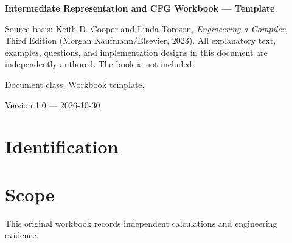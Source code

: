 \documentclass[10pt,letterpaper]{article}
\begin{document}
\hypersetup{pageanchor=false}%
\begin{titlepage}
\centering\vspace*{1.0in}
{\Huge\bfseries\textcolor{CompilerBlue}{Intermediate Representation and CFG Workbook --- Template}\par}
\vspace{.22in}{\Large Derivations, technical evidence and review\par}
\vspace{.4in}{\large Compiler Engineering Documentation Suite\par}
\vfill
\begin{minipage}{.86\linewidth}\small
Source basis: Keith D. Cooper and Linda Torczon, \emph{Engineering a Compiler}, Third Edition (Morgan Kaufmann/Elsevier, 2023). All explanatory text, examples, questions, and implementation designs in this document are independently authored. The book is not included.\par\medskip
Document class: Workbook template.
\end{minipage}
\vfill\textcolor{CompilerGray}{Version 1.0 --- 2026-10-30}\par
\end{titlepage}\hypersetup{pageanchor=true}
\tableofcontents\clearpage
\section{Identification}
\section{Scope}
 This original workbook records independent calculations and engineering evidence.
\end{document}
